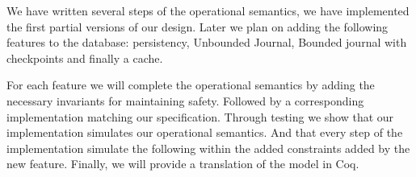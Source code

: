 \documentclass[systeme,french,english]{compas2022}
\begin{document}
We have written several steps of the operational semantics, we have implemented the first partial versions of our design.
Later we plan on adding the following features to the database: persistency, Unbounded Journal, Bounded journal with checkpoints and finally a cache.

For each feature we will complete the operational semantics by adding the necessary invariants for maintaining safety.
Followed by a corresponding implementation matching our specification.
Through testing we show that our implementation simulates our operational semantics.
And that every step of the implementation simulate the following within the added constraints added by the new feature.
Finally, we will provide a translation of the model in Coq.




\end{document}
